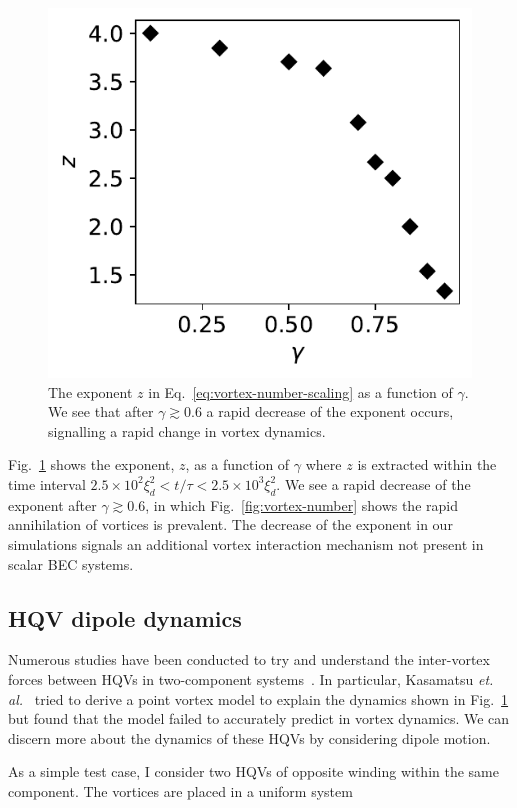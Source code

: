 \begin{figure}[t!]
    \centering
    \includegraphics{gfx/ch-twoCompDynamics/gamma_vs_expo.pdf}
    \caption{The exponent $z$ in Eq.~\eqref{eq:vortex-number-scaling} as a
    function of $\gamma$.
    We see that after $\gamma \gtrsim 0.6$ a rapid decrease of the exponent
    occurs, signalling a rapid change in vortex dynamics.}
    \label{fig:exponent-vs-gamma}
\end{figure}
Fig.~\ref{fig:exponent-vs-gamma} shows the exponent, $z$, as a function of
$\gamma$ where $z$ is extracted within the time interval
$2.5 \times 10^2\xi_d^2 < t/\tau < 2.5\times10^3\xi_d^2$.
We see a rapid decrease of the exponent after $\gamma \gtrsim 0.6$, in which
Fig.~\ref{fig:vortex-number} shows the rapid annihilation of vortices is
prevalent.
The decrease of the exponent in our simulations signals an additional vortex
interaction mechanism not present in scalar BEC systems.

\subsection{HQV dipole dynamics}
Numerous studies have been conducted to try and understand the inter-vortex
forces between HQVs in two-component systems~\cite{Eto2011, Kasamatsu2016}.
In particular, Kasamatsu {\it et. al.}~\cite{Kasamatsu2016} tried to derive a
point vortex model to explain the dynamics shown in
Fig.~\ref{fig:exponent-vs-gamma} but found that the model failed to accurately
predict in vortex dynamics.
We can discern more about the dynamics of these HQVs by considering dipole
motion.


As a simple test case, I consider two HQVs of opposite winding within the same
component.
The vortices are placed in a uniform system
